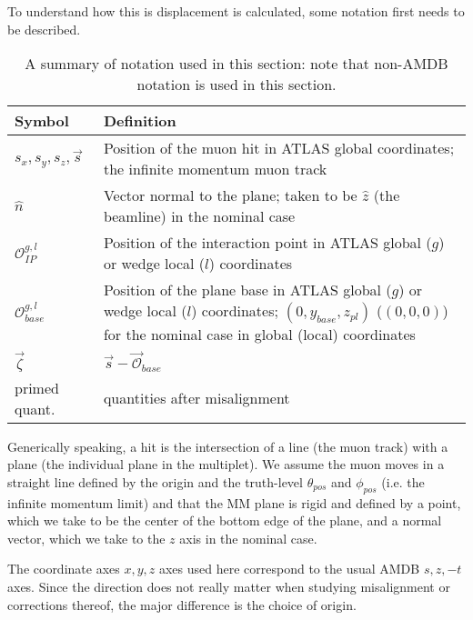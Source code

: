 To understand how this is displacement is calculated, some notation first needs to be described.

\begin{table}[htbp]
\caption{A summary of notation used in this section: note that non-AMDB notation is used in this section.
\label{tab:misnotation}}
\begin{center}
\begin{tabular}{|l|p{13 cm}|}
\hline
Symbol & Definition\\
\hline
$s_x,s_y,s_z,\vec{s}$ & Position of the muon hit in ATLAS global coordinates; the infinite momentum muon track\\
\hline
$\hat{n}$ & Vector normal to the plane; taken to be $\hat{z}$ (the beamline) in the nominal case\\
\hline
$\mathscr{O}_{IP}^{g,l}$ & Position of the interaction point in ATLAS global ($g$) or wedge local ($l$) coordinates\\
\hline
$\mathscr{O}_{base}^{g,l}$ & Position of the plane base in ATLAS global ($g$) or wedge local ($l$) coordinates; $\left(0,y_{base},z_{pl}\right)$ ($\left(0,0,0\right)$) for the nominal case in global (local) coordinates\\
\hline
$\vec{\zeta}$ & $\vec{s}-\vec{\mathscr{O}}_{base}$\\
\hline
primed quant. & quantities after misalignment\\
\hline
\end{tabular}
\end{center}
\end{table}

Generically speaking, a hit is the intersection of a line (the muon track) with a plane (the individual plane in the multiplet).  We assume the muon moves in a straight line defined by the origin and the truth-level $\theta_{pos}$ and $\phi_{pos}$ (i.e. the infinite momentum limit) and that the MM plane is rigid and defined by a point, which we take to be the center of the bottom edge of the plane, and a normal vector, which we take to the $z$ axis in the nominal case.

The coordinate axes $x,y,z$ axes used here correspond to the usual AMDB $s,z,-t$ axes.  Since the direction does not really matter when studying misalignment or corrections thereof, the major difference is the choice of origin.

